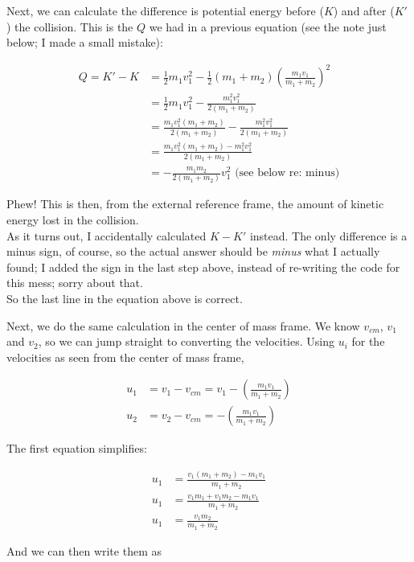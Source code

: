 Next, we can calculate the difference is potential energy before ($K$) and after ($K'$) the collision. This is the $Q$ we had in a previous equation (see the note just below; I made a small mistake):

\begin{align}
Q = K' - K &= \frac{1}{2} m_1 v_1^2 - \frac{1}{2} (m_1 + m_2) \left(\frac{m_1 v_1}{m_1 + m_2}\right)^2\\
           &= \frac{1}{2} m_1 v_1^2 - \frac{m_1^2 v_1^2}{2(m_1 + m_2)}\\
           &= \frac{m_1 v_1^2(m_1 + m_2)}{2(m_1 + m_2)} - \frac{m_1^2 v_1^2}{2(m_1 + m_2)}\\
           &= \frac{m_1 v_1^2(m_1 + m_2) - m_1^2 v_1^2}{2(m_1 + m_2)}\\
           &= - \frac{m_1 m_2}{2(m_1 + m_2)} v_1^2 \text{ (see below re: minus)}
\end{align}

Phew! This is then, from the external reference frame, the amount of kinetic energy lost in the collision.\\
As it turns out, I accidentally calculated $K - K'$ instead. The only difference is a minus sign, of course, so the actual answer should be \emph{minus} what I actually found; I added the sign in the last step above, instead of re-writing the code for this mess; sorry about that.\\
So the last line in the equation above is correct.

Next, we do the same calculation in the center of mass frame. We know $v_{cm}$, $v_1$ and $v_2$, so we can jump straight to converting the velocities. Using $u_i$ for the velocities as seen from the center of mass frame,

\begin{align}
u_1 &= v_1 - v_{cm} = v_1 - \left(\frac{m_1 v_1}{m_1 + m_2}\right)\\
u_2 &= v_2 - v_{cm} = - \left(\frac{m_1 v_1}{m_1 + m_2}\right)
\end{align}

The first equation simplifies:

\begin{align}
u_1 &= \frac{v_1(m_1 + m_2) - m_1 v_1}{m_1 + m_2}\\
u_1 &= \frac{v_1 m_1 + v_1 m_2 - m_1 v_1}{m_1 + m_2}\\
u_1 &= \frac{v_1 m_2}{m_1 + m_2}
\end{align}

And we can then write them as


